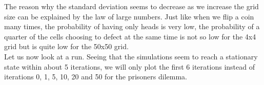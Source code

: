 \documentclass[a4paper]{article}
\begin{document}
The reason why the standard deviation seems to decrease as we increase the grid 
size can be explained by the law of large numbers. Just like when we flip a
coin many times, the probability of having only heads is very low, 
the probability of a quarter of the cells choosing to defect at the same time
is not so low for the 4x4 grid but is quite low for the 50x50 grid. \\

Let us now look at a run. Seeing that the simulations seem to reach a stationary
state within about 5 iterations, we will only plot the first 6 iterations
instead of iterations 0, 1, 5, 10, 20 and 50 for the prisoners dilemma.

\begin{figure}[H]
	\centering
	\\

\end{figure}
\end{document}
